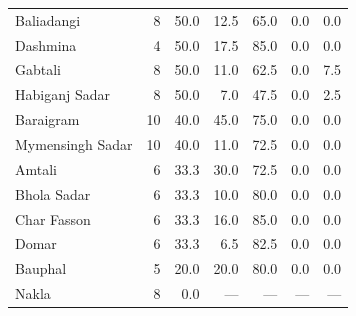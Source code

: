 \begin{longtable}{lrrrrrr}
Baliadangi & 8 & 50.0 & 12.5 & 65.0 & 0.0 & 0.0 \\
Dashmina & 4 & 50.0 & 17.5 & 85.0 & 0.0 & 0.0 \\
Gabtali & 8 & 50.0 & 11.0 & 62.5 & 0.0 & 7.5 \\
Habiganj Sadar & 8 & 50.0 & 7.0 & 47.5 & 0.0 & 2.5 \\
Baraigram & 10 & 40.0 & 45.0 & 75.0 & 0.0 & 0.0 \\
Mymensingh Sadar & 10 & 40.0 & 11.0 & 72.5 & 0.0 & 0.0 \\
Amtali & 6 & 33.3 & 30.0 & 72.5 & 0.0 & 0.0 \\
Bhola Sadar & 6 & 33.3 & 10.0 & 80.0 & 0.0 & 0.0 \\
Char Fasson & 6 & 33.3 & 16.0 & 85.0 & 0.0 & 0.0 \\
Domar & 6 & 33.3 & 6.5 & 82.5 & 0.0 & 0.0 \\
Bauphal & 5 & 20.0 & 20.0 & 80.0 & 0.0 & 0.0 \\
Nakla & 8 & 0.0 & {---} & {---} & {---} & {---} \\
\end{longtable}